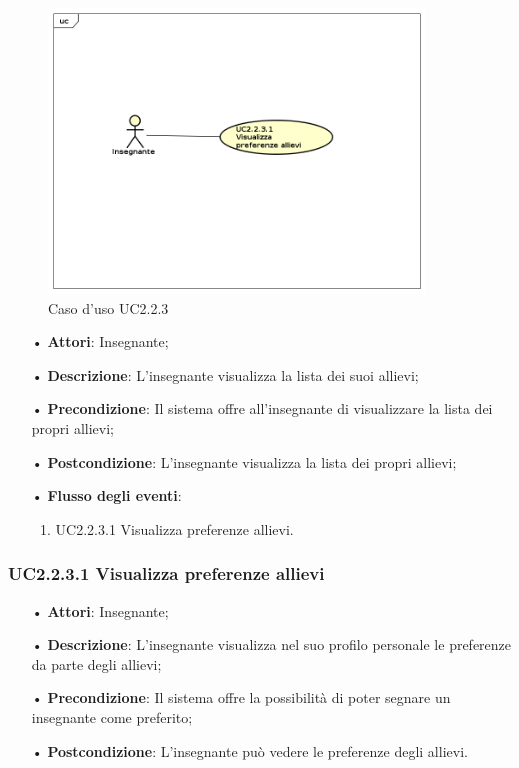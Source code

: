 \begin{figure}[H]
\centering
\includegraphics[width=10cm]{img/UC223.png} 
\caption{Caso d'uso UC2.2.3}
\end{figure}

\begin{itemize}
	\item[•] \textbf{Attori}: Insegnante;
	\item[•] \textbf{Descrizione}: L’insegnante visualizza la lista dei suoi allievi;
	\item[•] \textbf{Precondizione}: Il sistema offre all’insegnante di visualizzare la lista dei propri allievi;
	\item[•] \textbf{Postcondizione}: L’insegnante visualizza la lista dei propri allievi;
	\item[•] \textbf{Flusso degli eventi}:
		\begin{enumerate}
			\item UC2.2.3.1 Visualizza preferenze allievi.
		\end{enumerate}
\end{itemize}

\subsubsection{UC2.2.3.1 Visualizza preferenze allievi}
\begin{itemize}
	\item[•] \textbf{Attori}: Insegnante;
	\item[•] \textbf{Descrizione}: L’insegnante visualizza nel suo profilo personale le preferenze da parte degli allievi;
	\item[•] \textbf{Precondizione}: Il sistema offre la possibilità di poter segnare un insegnante come preferito;
	\item[•] \textbf{Postcondizione}: L’insegnante può vedere le preferenze degli allievi.
\end{itemize}


